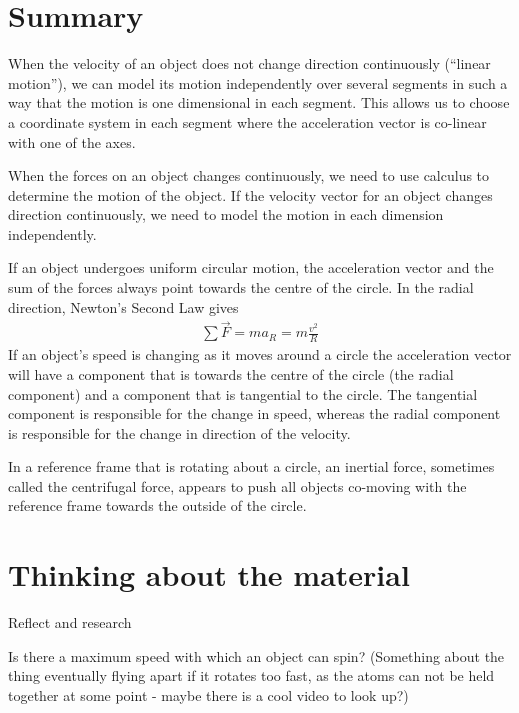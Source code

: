 
\newpage
\section{Summary}
\vspace{1cm}
\begin{chapterSummary}

When the velocity of an object does not change direction continuously (``linear motion''), we can model its motion independently over several segments in such a way that the motion is one dimensional in each segment. This allows us to choose a coordinate system in each segment where the acceleration vector is co-linear with one of the axes.

When the forces on an object changes continuously, we need to use calculus to determine the motion of the object. If the velocity vector for an object changes direction continuously, we need to model the motion in each dimension independently.

If an object undergoes uniform circular motion, the acceleration vector and the sum of the forces always point towards the centre of the circle. In the radial direction, Newton's Second Law gives
\begin{align*}
\sum \vec F = ma_R = m\frac{v^2}{R}
\end{align*}
If an object's speed is changing as it moves around a circle the acceleration vector will have a component that is towards the centre of the circle (the radial component) and a component that is tangential to the circle. The tangential component is responsible for the change in speed, whereas the radial component is responsible for the change in direction of the velocity.

In a reference frame that is rotating about a circle, an inertial force, sometimes called the centrifugal force, appears to push all objects co-moving with the reference frame towards the outside of the circle.

\end{chapterSummary}

\newpage
\section{Thinking about the material}
\begin{chapteractivity}{Reflect and research}
{
\item Is there a maximum speed with which an object can spin? (Something about the thing eventually flying apart if it rotates too fast, as the atoms can not be held together at some point - maybe there is a cool video to look up?)
}
\end{chapteractivity}

